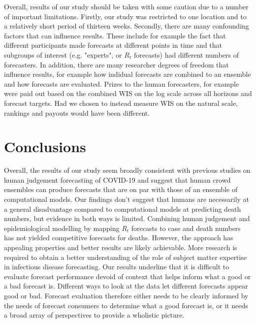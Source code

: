 \documentclass[10pt,a4paper,twocolumn]{article}
\begin{document}

Overall, results of our study should be taken with some caution due to a number of important limitations. Firstly, our study was restricted to one location and to a relatively short period of thirteen weeks. Secondly, there are many confounding factors that can influence results. These include for example the fact that different participants made forecasts at different points in time and that subgroups of interest (e.g. "experts", or $R_t$ forecasts) had different numbers of forecasters. In addition, there are many researcher degrees of freedom that influence results, for example how indidual forecasts are combined to an ensemble and how forecasts are evaluated. Prizes to the human forecasters, for example were paid out based on the combined WIS on the log scale across all horizons and forecast targets. Had we chosen to instead measure WIS on the natural scale, rankings and payouts would have been different. 


\section*{Conclusions}

Overall, the results of our study seem broadly consistent with previous studies on human judgement forecasting of COVID-19 and suggest that human crowd ensembles can produce forecasts that are on par with those of an ensemble of computational models. Our findings don't suggest that humans are necessarily at a general disadvantage compared to computational models at predicting death numbers, but evidence in both ways is limited. Combining human judgement and epidemiological modelling by mapping $R_t$ forecasts to case and death numbers has not yielded competitive forecasts for deaths. However, the approach has appealing properties and better results are likely achievable. More research is required to obtain a better understanding of the role of subject matter expertise in infectious disease forecasting. Our results underline that it is difficult to evaluate forecast performance devoid of context that helps inform what a good or a bad forecast is. Different ways to look at the data let different forecasts appear good or bad. Forecast evaluation therefore either needs to be clearly informed by the needs of forecast consumers to determine what a good forecast is, or it needs a broad array of perspectives to provide a wholistic picture. 
\end{document}
